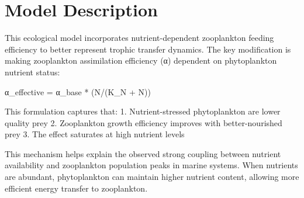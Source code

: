 \section{Model Description}

This ecological model incorporates nutrient-dependent zooplankton feeding efficiency to better represent trophic transfer dynamics. The key modification is making zooplankton assimilation efficiency (α) dependent on phytoplankton nutrient status:

α_effective = α_base * (N/(K_N + N))

This formulation captures that:
1. Nutrient-stressed phytoplankton are lower quality prey
2. Zooplankton growth efficiency improves with better-nourished prey
3. The effect saturates at high nutrient levels

This mechanism helps explain the observed strong coupling between nutrient availability and zooplankton population peaks in marine systems. When nutrients are abundant, phytoplankton can maintain higher nutrient content, allowing more efficient energy transfer to zooplankton.
